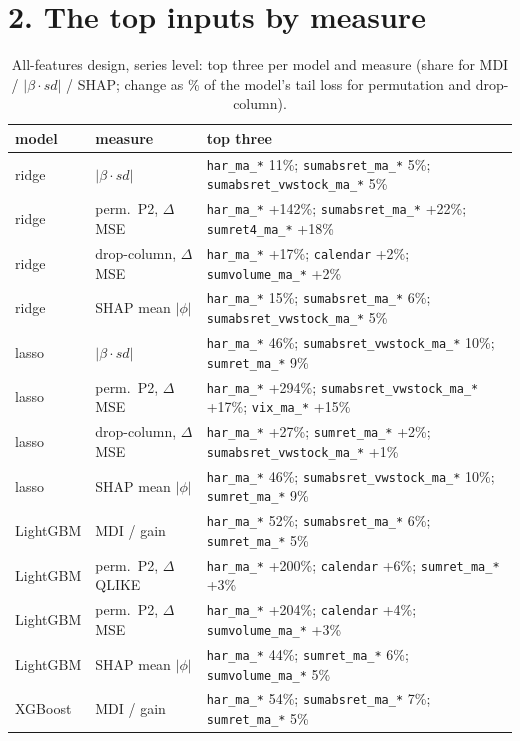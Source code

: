 \documentclass[10pt]{article}
\begin{document}
\section*{2. The top inputs by measure}
\begin{table}[H]\centering\scriptsize
\caption{All-features design, series level: top three per model and measure (share for MDI / $|\beta\cdot sd|$ / SHAP; change as \% of the model's tail loss for permutation and drop-column).}
\begin{tabular}{llp{11.2cm}}\toprule
model & measure & top three\\\midrule
ridge & $|\beta\cdot sd|$ & \texttt{har\_ma\_*} 11\%; \texttt{sumabsret\_ma\_*} 5\%; \texttt{sumabsret\_vwstock\_ma\_*} 5\% \\
ridge & perm.\ P2, $\Delta$MSE & \texttt{har\_ma\_*} +142\%; \texttt{sumabsret\_ma\_*} +22\%; \texttt{sumret4\_ma\_*} +18\% \\
ridge & drop-column, $\Delta$MSE & \texttt{har\_ma\_*} +17\%; \texttt{calendar} +2\%; \texttt{sumvolume\_ma\_*} +2\% \\
ridge & SHAP mean $|\phi|$ & \texttt{har\_ma\_*} 15\%; \texttt{sumabsret\_ma\_*} 6\%; \texttt{sumabsret\_vwstock\_ma\_*} 5\% \\
lasso & $|\beta\cdot sd|$ & \texttt{har\_ma\_*} 46\%; \texttt{sumabsret\_vwstock\_ma\_*} 10\%; \texttt{sumret\_ma\_*} 9\% \\
lasso & perm.\ P2, $\Delta$MSE & \texttt{har\_ma\_*} +294\%; \texttt{sumabsret\_vwstock\_ma\_*} +17\%; \texttt{vix\_ma\_*} +15\% \\
lasso & drop-column, $\Delta$MSE & \texttt{har\_ma\_*} +27\%; \texttt{sumret\_ma\_*} +2\%; \texttt{sumabsret\_vwstock\_ma\_*} +1\% \\
lasso & SHAP mean $|\phi|$ & \texttt{har\_ma\_*} 46\%; \texttt{sumabsret\_vwstock\_ma\_*} 10\%; \texttt{sumret\_ma\_*} 9\% \\
LightGBM & MDI / gain & \texttt{har\_ma\_*} 52\%; \texttt{sumabsret\_ma\_*} 6\%; \texttt{sumret\_ma\_*} 5\% \\
LightGBM & perm.\ P2, $\Delta$QLIKE & \texttt{har\_ma\_*} +200\%; \texttt{calendar} +6\%; \texttt{sumret\_ma\_*} +3\% \\
LightGBM & perm.\ P2, $\Delta$MSE & \texttt{har\_ma\_*} +204\%; \texttt{calendar} +4\%; \texttt{sumvolume\_ma\_*} +3\% \\
LightGBM & SHAP mean $|\phi|$ & \texttt{har\_ma\_*} 44\%; \texttt{sumret\_ma\_*} 6\%; \texttt{sumvolume\_ma\_*} 5\% \\
XGBoost & MDI / gain & \texttt{har\_ma\_*} 54\%; \texttt{sumabsret\_ma\_*} 7\%; \texttt{sumret\_ma\_*} 5\% \\

\end{tabular}
\end{table}
\end{document}

